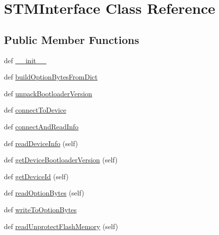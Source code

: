 \hypertarget{classstm__tools_1_1serialflasher_1_1stmdevice_1_1STMInterface}{}\section{S\+T\+M\+Interface Class Reference}
\label{classstm__tools_1_1serialflasher_1_1stmdevice_1_1STMInterface}
\subsection*{Public Member Functions}
\begin{DoxyCompactItemize}
\item 
def \hyperlink{classstm__tools_1_1serialflasher_1_1stmdevice_1_1STMInterface_ac775ee34451fdfa742b318538164070e}{\+\_\+\+\_\+init\+\_\+\+\_\+}
\item 
def \hyperlink{classstm__tools_1_1serialflasher_1_1stmdevice_1_1STMInterface_a45b59dff44460c9189958d8127143bb6}{build\+Option\+Bytes\+From\+Dict}
\item 
def \hyperlink{classstm__tools_1_1serialflasher_1_1stmdevice_1_1STMInterface_a4717902150045f81cc2a9756cae8df29}{unpack\+Bootloader\+Version}
\item 
def \hyperlink{classstm__tools_1_1serialflasher_1_1stmdevice_1_1STMInterface_a9562076cb53f736a4ec69528c9ce617d}{connect\+To\+Device}
\item 
def \hyperlink{classstm__tools_1_1serialflasher_1_1stmdevice_1_1STMInterface_a51ad4fd68300a1811eb5e2b0c6a5938a}{connect\+And\+Read\+Info}
\item 
def \hyperlink{classstm__tools_1_1serialflasher_1_1stmdevice_1_1STMInterface_aa42a47690be7cd535fab1a929f9d068b}{read\+Device\+Info} (self)
\item 
def \hyperlink{classstm__tools_1_1serialflasher_1_1stmdevice_1_1STMInterface_ae12f48de9412bb8556457dba868a208e}{get\+Device\+Bootloader\+Version} (self)
\item 
def \hyperlink{classstm__tools_1_1serialflasher_1_1stmdevice_1_1STMInterface_a8a04482352e8b6862cb2346679aadf8a}{get\+Device\+Id} (self)
\item 
def \hyperlink{classstm__tools_1_1serialflasher_1_1stmdevice_1_1STMInterface_a26e0dced9e2a1b627e517828aecb1c8a}{read\+Option\+Bytes} (self)
\item 
def \hyperlink{classstm__tools_1_1serialflasher_1_1stmdevice_1_1STMInterface_a4d0e6e64dcd774383c834cd743ef9c4d}{write\+To\+Option\+Bytes}
\item 
def \hyperlink{classstm__tools_1_1serialflasher_1_1stmdevice_1_1STMInterface_a6126a4a43b416c02f7226879ffe107d8}{read\+Unprotect\+Flash\+Memory} (self)

\end{DoxyCompactItemize}
